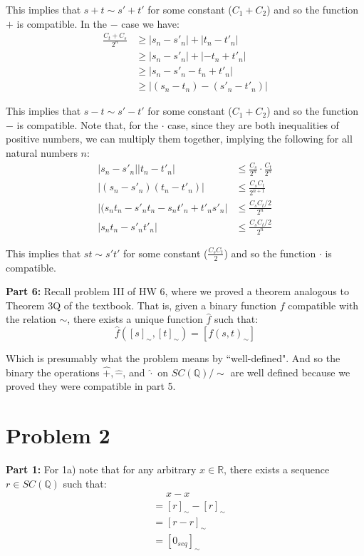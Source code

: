 \documentclass{article}
\begin{document}
This implies that $s+t\sim s'+t'$ for some constant ($C_1+C_2$) and so the function $+$ is compatible. In the $-$ case we have:
\begin{align*}
    \frac{C_t+C_s}{2^n}&\ge|s_n-s'_n|+|t_n-t'_n|\tag{sum of (1) and (2)}\\
    &\ge|s_n-s'_n|+|-t_n+t'_n|\tag{multiply by $-1$}\\
    &\ge|s_n-s'_n-t_n+t'_n|\tag{triangle inequality}\\
    &\ge|(s_n-t_n)-(s'_n-t'_n)|\tag{assoc., comm., \& distr. prop. of $\mathbb Q$}
\end{align*}

This implies that $s-t\sim s'-t'$ for some constant ($C_1+C_2$) and so the function $-$ is compatible. Note that, for the $\cdot$ case, since they are both inequalities of positive numbers, we can multiply them together, implying the following for all natural numbers $n$:
\begin{align*}
    |s_n-s'_n||t_n-t'_n|&\le\frac{C_s}{2^n}\cdot\frac{C_t}{2^n}\tag{product of (1) and (2)}\\
    |(s_n-s'_n)(t_n-t'_n)|&\le\frac{C_sC_t}{2^{n+1}}\tag{product of absolute values}\\
    |(s_nt_n-s'_nt_n-s_nt'_n+t'_ns'_n|&\le\frac{C_sC_t/2}{2^{n}}\\
    |s_nt_n-s'_nt'_n|&\le\frac{C_sC_t/2}{2^{n}}
\end{align*}

This implies that $st\sim s't'$ for some constant ($\frac{C_sC_t}{2}$) and so the function $\cdot$ is compatible.
\bigskip

\noindent\textbf{Part 6:} Recall problem III of HW 6, where we proved a theorem analogous to Theorem 3Q of the textbook. That is, given a binary function $f$ compatible with the relation $\sim$, there exists a unique function $\hat{f}$ such that:
\begin{equation*}
    \hat{f}([s]_\sim,[t]_\sim)=[f(s,t)_\sim]
\end{equation*}

Which is presumably what the problem means by ``well-defined". And so the binary the operations $\hat +,\hat -$, and $\hat\cdot$ on $SC(\mathbb Q)/\sim$ are well defined because we proved they were compatible in part 5.

\section*{Problem 2}
\noindent\textbf{Part 1:} For 1a) note that for any arbitrary $x\in\mathbb R$, there exists a sequence $r\in SC(\mathbb Q)$ such that:
\begin{align*}
    &\phantom{=}x-x\tag{well-defined by prob. 1, part 6}\\
    &=[r]_\sim-[r]_\sim\tag{i}\\
    &=[r-r]_\sim\tag{prob. 1, part 6}\\
    &=[0_{seq}]_\sim\tag{$-$ on $\mathbb Q$}
\end{align*}
\end{document}
